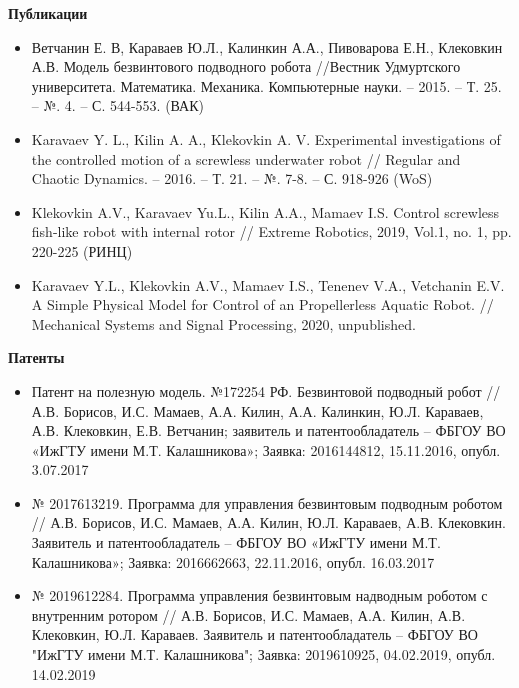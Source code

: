 \textbf{Публикации}
\begin{itemize}
	
	\item Ветчанин Е. В, Караваев Ю.Л., Калинкин А.А., Пивоварова Е.Н., Клековкин А.В. Модель безвинтового подводного робота //Вестник Удмуртского университета. Математика. Механика. Компьютерные науки. – 2015. – Т. 25. – №. 4. – С. 544-553. (ВАК)
	
	\item Karavaev Y. L., Kilin A. A., Klekovkin A. V. Experimental investigations of the controlled motion of a screwless underwater robot // Regular and Chaotic Dynamics. – 2016. – Т. 21. – №. 7-8. – С. 918-926 (WoS)
	
	\item Klekovkin A.V., Karavaev Yu.L., Kilin A.A., Mamaev I.S. Control screwless fish-like robot with internal rotor // Extreme Robotics,  2019, Vol.1, no. 1, pp. 220-225 (РИНЦ)
	
	\item Karavaev Y.L., Klekovkin A.V., Mamaev I.S., Tenenev V.A., Vetchanin E.V. A Simple Physical Model for Control of an Propellerless Aquatic Robot. //  Mechanical Systems and Signal Processing, 2020, unpublished.
	
\end{itemize}



\textbf{Патенты}
\begin{itemize}



\item Патент на полезную модель. №172254 РФ. Безвинтовой подводный робот //  А.В. Борисов, И.С. Мамаев, А.А. Килин, А.А. Калинкин, Ю.Л. Караваев, А.В. Клековкин, Е.В. Ветчанин; заявитель и патентообладатель – ФБГОУ ВО «ИжГТУ имени М.Т. Калашникова»; Заявка: 2016144812, 15.11.2016, опубл. 3.07.2017


\item № 2017613219. Программа для управления безвинтовым подводным роботом // А.В. Борисов, И.С. Мамаев, А.А. Килин, Ю.Л. Караваев, А.В. Клековкин. Заявитель и патентообладатель – ФБГОУ ВО «ИжГТУ имени М.Т. Калашникова»; Заявка: 2016662663, 22.11.2016, опубл. 16.03.2017


\item № 2019612284. Программа управления безвинтовым надводным роботом с внутренним ротором // А.В. Борисов, И.С. Мамаев, А.А. Килин, А.В. Клековкин, Ю.Л. Караваев. Заявитель и патентообладатель – ФБГОУ ВО "ИжГТУ имени М.Т. Калашникова"; Заявка: 2019610925, 04.02.2019, опубл. 14.02.2019


\end{itemize}


